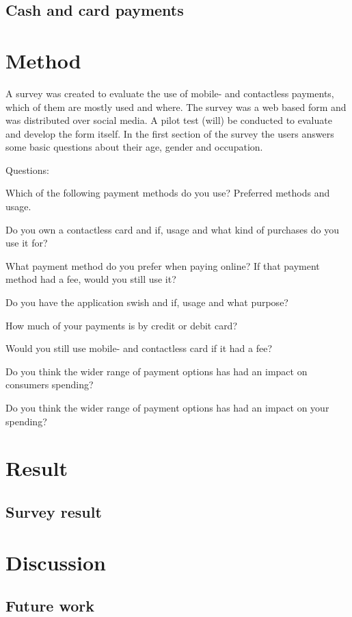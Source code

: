 \documentclass[runningheads,a4paper,oribibl]{llncs}
\begin{document}
\subsection{Cash and card payments}


\section{Method}

A survey was created to evaluate the use of mobile- and contactless payments, which of them are mostly used and where.
The survey was a web based form and was distributed over social media. A pilot test (will) be conducted to evaluate and develop the form itself. In the first section of the survey the users answers some basic questions about their age, gender and occupation.

Questions:

Which of the following payment methods do you use?
Preferred methods and usage.

Do you own a contactless card and if, usage and what kind of purchases do you use it for?

What payment method do you prefer when paying online?
If that payment method had a fee, would you still use it?

Do you have the application swish and if, usage and what purpose?

How much of your payments is by credit or debit card?

Would you still use mobile- and contactless card if it had a fee?

Do you think the wider range of payment options has had an impact on consumers spending?

Do you think the wider range of payment options has had an impact on your spending?




\section{Result}

\subsection{Survey result}
\section{Discussion}
\subsection{Future work}
\end{document}
